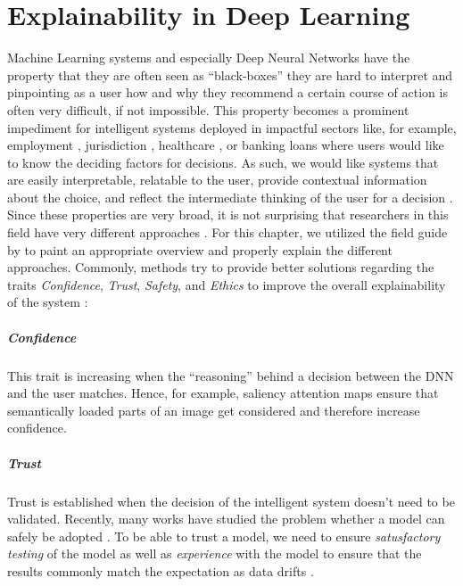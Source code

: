 \chapter{Explainability in Deep Learning} 
\label{sec:Explainability} 

Machine Learning systems and especially Deep Neural Networks have the property that they are often seen as ``black-boxes'' \ie they are hard to interpret and pinpointing as a user how and why they recommend a certain course of action is often very difficult, if not impossible. This property becomes a prominent impediment for intelligent systems deployed in impactful sectors like, for example, employment \citep{QinZXZJCX18, CaiSJLQXZ20, ZhaoHCFZ18}, jurisdiction \citep{GuoHQX019}, healthcare \citep{Pasa2019}, or banking loans where users would like to know the deciding factors for decisions. As such, we would like systems that are easily interpretable, relatable to the user, provide contextual information about the choice, and reflect the intermediate thinking of the user for a decision \citep{xie2020explainable}. Since these properties are very broad, it is not surprising that researchers in this field have very different approaches \citep{xie2020explainable}. For this chapter, we utilized the field guide by \citet{xie2020explainable} to paint an appropriate overview and properly explain the different approaches. Commonly, methods try to provide better solutions regarding the traits \emph{Confidence}, \emph{Trust}, \emph{Safety}, and \emph{Ethics} to improve the overall explainability of the system \citep{xie2020explainable}:

\paragraph{Confidence}
This trait is increasing when the ``reasoning'' behind a decision between the DNN and the user matches. Hence, for example, saliency attention maps \citep{ParkHARSDR18, HudsonM18} ensure that semantically loaded parts of an image get considered and therefore increase confidence.

\paragraph{Trust} 
Trust is established when the decision of the intelligent system doesn't need to be validated. Recently, many works have studied the problem whether a model can safely be adopted \citep{GharibLBADB18, VarshneyA17, JiangKGG18}. To be able to trust a model, we need to ensure \emph{satusfactory testing} of the model as well as \emph{experience} with the model to ensure that the results commonly match the expectation as data drifts \citep{xie2020explainable}.

